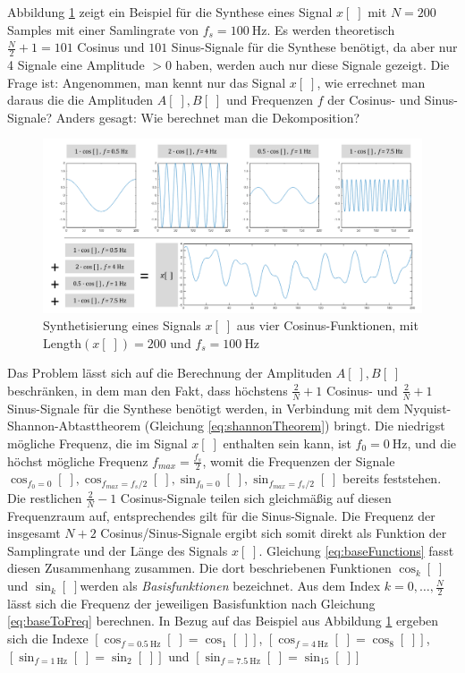 Abbildung \ref{img:fftExample02} zeigt ein Beispiel für die Synthese eines Signal $x[\;]$ mit $N = 200$ Samples mit einer Samlingrate von $f_s = \SI{100}{\hertz}$. Es werden theoretisch $\frac{N}{2} + 1 = 101$ Cosinus und $101$ Sinus-Signale für die Synthese benötigt, da aber nur 4 Signale eine Amplitude $> 0$ haben, werden auch nur diese Signale gezeigt. Die Frage ist: Angenommen, man kennt nur das Signal $x[\;]$, wie errechnet man daraus die die Amplituden $A[\;], B[\;]$ und Frequenzen $f$ der Cosinus- und Sinus-Signale? Anders gesagt: Wie berechnet man die Dekomposition?

\begin{figure}[h]
	\centering
	\includegraphics[width=1\textwidth]{bilder/fftExp05.png}
	\caption{Synthetisierung eines Signals $x[\;]$ aus vier Cosinus-Funktionen, mit Length$(x[\;]) = 200$ und $f_s = \SI{100}{\hertz}$}
	\label{img:fftExample02}
\end{figure}

Das Problem lässt sich auf die Berechnung der Amplituden $A[\;],B[\; ]$ beschränken, in dem man den Fakt, dass höchstens $\frac{2}{N} + 1$ Cosinus- und $\frac{2}{N} + 1$ Sinus-Signale für die Synthese benötigt werden, in Verbindung mit dem Nyquist-Shannon-Abtasttheorem (Gleichung \ref{eq:shannonTheorem}) bringt. Die niedrigst mögliche Frequenz, die im Signal $x[\;]$ enthalten sein kann, ist $f_0 = \SI{0}{\hertz}$, und die höchst mögliche Frequenz $f_{max} = \frac{f_s}{2}$, womit die Frequenzen der Signale $\cos_{f_0 = 0}[\;] , \cos_{f_{max} = f_s/2}[\;],\sin_{f_0 = 0}[\;], \sin_{f_{max} = f_s/2}[\;]$ bereits feststehen. Die restlichen $\frac{2}{N} - 1$ Cosinus-Signale teilen sich gleichmäßig auf diesen Frequenzraum auf, entsprechendes gilt für die Sinus-Signale. Die Frequenz der insgesamt $N+2$ Cosinus/Sinus-Signale ergibt sich somit direkt als Funktion der Samplingrate und der Länge des Signals $x[\;]$. Gleichung \ref{eq:baseFunctions} fasst diesen Zusammenhang zusammen. Die dort beschriebenen Funktionen $\cos_k[\;]$ und $\sin_k[\;]$werden als \emph{Basisfunktionen} bezeichnet. Aus dem  Index $k = 0 ,\ldots, \frac{N}{2}$ lässt sich die Frequenz der jeweiligen Basisfunktion nach Gleichung \ref{eq:baseToFreq} berechnen.\cite[140 - 151, S.]{dspGuide}  In Bezug auf das Beispiel aus Abbildung \ref{img:fftExample02} ergeben sich die Indexe $[\cos_{f=\SI{0.5}{\hertz}}[\;] = \cos_1[\;]]$, $[\cos_{f=\SI{4}{\hertz}}[\;] = \cos_8[\;]]$, $[\sin_{f=\SI{1}{\hertz}}[\;] = \sin_2[\;]]$ und $[\sin_{f=\SI{7.5}{\hertz}}[\;] = \sin_{15}[\;]]$

